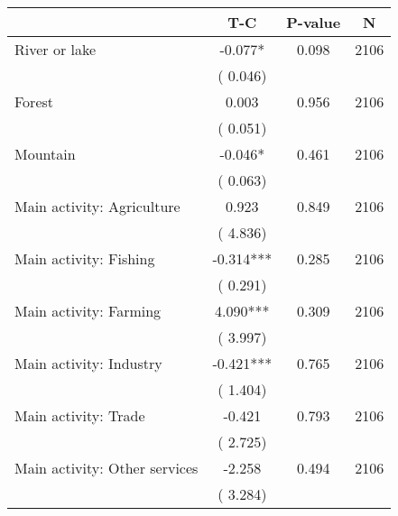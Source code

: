 
\begin{tabular}{l*{3}{c}}\hline&\multicolumn{1}{c}{T-C}&\multicolumn{1}{c}{P-value}&\multicolumn{1}{c}{N} \\ \hline
 River or lake                 &             -0.077*          &        0.098 & 2106          \\ 
                               &        (       0.046)             &                        &                              \\ 
 Forest                 &              0.003          &        0.956 & 2106          \\ 
                               &        (       0.051)             &                        &                              \\ 
 Mountain                 &             -0.046*          &        0.461 & 2106          \\ 
                               &        (       0.063)             &                        &                              \\ 
 Main activity: Agriculture                  &              0.923          &        0.849 & 2106          \\ 
                               &        (       4.836)             &                        &                              \\ 
 Main activity: Fishing                 &             -0.314***          &        0.285 & 2106          \\ 
                               &        (       0.291)             &                        &                              \\ 
 Main activity: Farming                 &              4.090***          &        0.309 & 2106          \\ 
                               &        (       3.997)             &                        &                              \\ 
 Main activity: Industry                 &             -0.421***          &        0.765 & 2106          \\ 
                               &        (       1.404)             &                        &                              \\ 
 Main activity: Trade                 &             -0.421          &        0.793 & 2106          \\ 
                               &        (       2.725)             &                        &                              \\ 
 Main activity: Other services                 &             -2.258          &        0.494 & 2106          \\ 
                               &        (       3.284)             &                        &                              \\ 
\hline \end{tabular}                                                                                              

